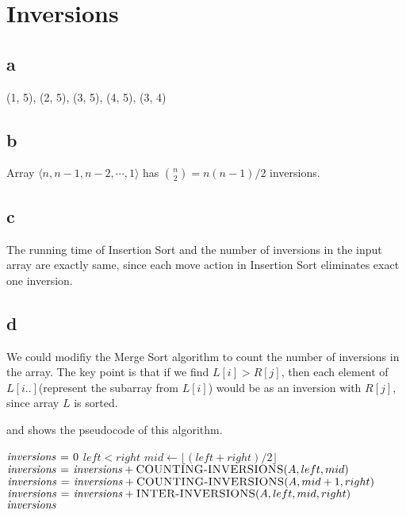 \section{Inversions}

\subsection{a}

(1, 5), (2, 5), (3, 5), (4, 5), (3, 4)


\subsection{b}

Array $\langle n, n - 1, n - 2, \cdots, 1 \rangle$ has $\binom{n}{2} = n(n - 1) / 2$ inversions.


\subsection{c}

The running time of Insertion Sort and the number of inversions in the input array are exactly same, since each move action in Insertion Sort eliminates exact one inversion.


\subsection{d}

We could modifiy the Merge Sort algorithm to count the number of inversions in the array.
The key point is that if we find $L[i] > R[j]$, then each element of $L[i..]$(represent the subarray from $L[i]$) would be as an inversion with $R[j]$, since array $L$ is sorted.

 and  shows the pseudocode of this algorithm.

\begin{codebox}
\li	$\id{inversions} \gets 0$
\li	\If $left < right$
\li	\Then
		$mid \gets \lfloor (left + right) / 2 \rfloor$
\li		$\id{inversions} \gets \id{inversions} + \proc{COUNTING-INVERSIONS}(A, left, mid)$
\li		$\id{inversions} \gets \id{inversions} + \proc{COUNTING-INVERSIONS}(A, mid + 1, right)$
\li		$\id{inversions} \gets \id{inversions} + \proc{INTER-INVERSIONS}(A, left, mid, right)$
	\End
\li	\Return $\id{inversions}$
\end{codebox}


